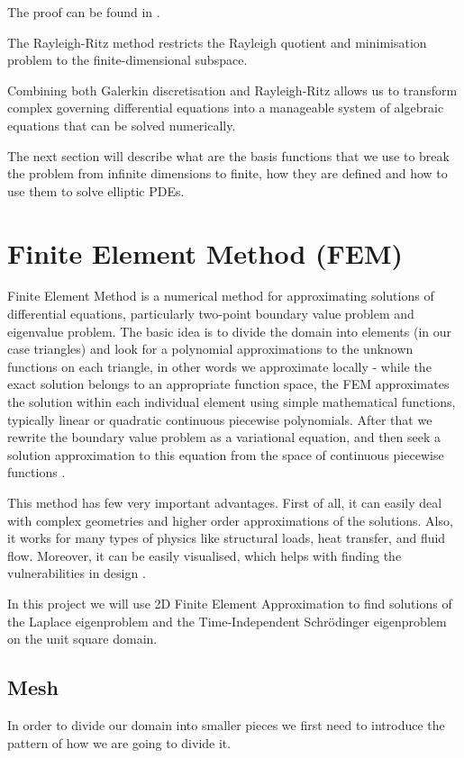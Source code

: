 \documentclass[acmsmall,screen]{MapleTrans}
\begin{document}
The proof can be found in \cite[p.~3]{b9.1}.

The Rayleigh-Ritz method restricts the Rayleigh quotient and minimisation problem to the finite-dimensional subspace.

Combining both Galerkin discretisation and Rayleigh-Ritz allows us to transform complex governing differential equations into a manageable system of algebraic equations that can be solved numerically.

The next section will describe what are the basis functions that we use to break the problem from infinite dimensions to finite, how they are defined and how to use them to solve elliptic PDEs.



\section{Finite Element Method (FEM)}

Finite Element Method is a numerical method for approximating solutions of differential equations, particularly two-point boundary value problem and eigenvalue problem. The basic idea is to divide the domain into elements (in our case triangles) and look for a polynomial approximations to the unknown functions on each triangle, 
in other words we approximate locally - while the exact solution belongs to an appropriate function space, the FEM approximates the solution within each individual element using simple mathematical functions, typically linear or quadratic continuous piecewise polynomials. 
After that we rewrite the boundary value problem as a variational equation, and then seek a solution approximation to this equation from the space of continuous piecewise functions \cite{b10}.

This method has few very important advantages. First of all, it can easily deal with complex geometries and higher order approximations of the solutions. Also, it works for many types of physics like structural loads, heat transfer, and fluid flow. Moreover, it can be easily visualised, which helps with finding the vulnerabilities in design \cite{b11}.

In this project we will use 2D Finite Element Approximation to find solutions of the Laplace eigenproblem and the Time-Independent Schr\"{o}dinger eigenproblem on the unit square domain.


\subsection{Mesh}
In order to divide our domain into smaller pieces we first need to introduce the pattern of how we are going to divide it.
\end{document}
